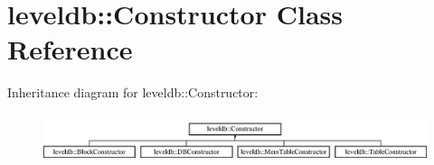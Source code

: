 \hypertarget{classleveldb_1_1_constructor}{}\section{leveldb\+:\+:Constructor Class Reference}
\label{classleveldb_1_1_constructor}
Inheritance diagram for leveldb\+:\+:Constructor\+:\begin{figure}[H]
\begin{center}
\leavevmode
\includegraphics[height=1.465969cm]{classleveldb_1_1_constructor}
\end{center}
\end{figure}
